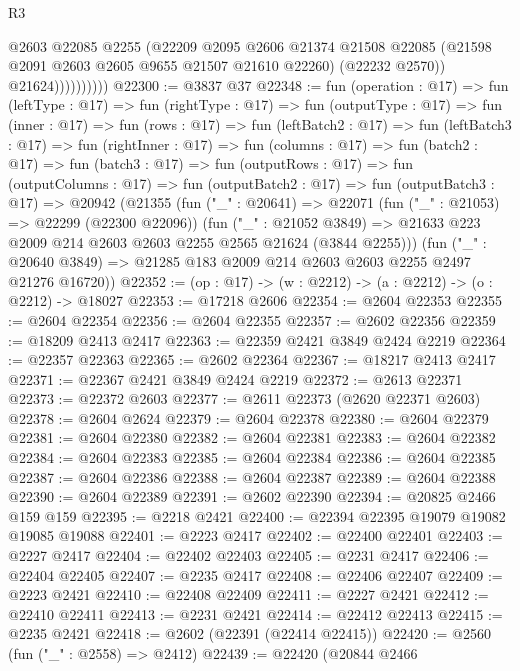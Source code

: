 \begin{lexlean}{R3}
\begin{coremodule}
                        @2603
                        @22085
                        @2255
                        (@22209
                          @2095
                          @2606
                          @21374
                          @21508
                          @22085
                          (@21598 @2091 @2603 @2605 @9655 @21507 @21610 @22260)
                          (@22232 @2570))
                        @21624))))))))))
@22300 := @3837 @37
@22348 := fun (operation : @17) =>
  fun (leftType : @17) =>
  fun (rightType : @17) =>
  fun (outputType : @17) =>
  fun (inner : @17) =>
  fun (rows : @17) =>
  fun (leftBatch2 : @17) =>
  fun (leftBatch3 : @17) =>
  fun (rightInner : @17) =>
  fun (columns : @17) =>
  fun (batch2 : @17) =>
  fun (batch3 : @17) =>
  fun (outputRows : @17) =>
  fun (outputColumns : @17) =>
  fun (outputBatch2 : @17) =>
  fun (outputBatch3 : @17) =>
  @20942
    (@21355
      (fun ("_" : @20641) =>
      @22071
        (fun ("_" : @21053) => @22299 (@22300 @22096))
        (fun ("_" : @21052 @3849) =>
        @21633 @223 @2009 @214 @2603 @2603 @2255 @2565 @21624 (@3844 @2255)))
      (fun ("_" : @20640 @3849) => @21285 @183 @2009 @214 @2603 @2603 @2255 @2497 @21276 @16720))
@22352 := (op : @17) -> (w : @2212) -> (a : @2212) -> (o : @2212) -> @18027
@22353 := @17218 @2606
@22354 := @2604 @22353
@22355 := @2604 @22354
@22356 := @2604 @22355
@22357 := @2602 @22356
@22359 := @18209 @2413 @2417
@22363 := @22359 @2421 @3849 @2424 @2219
@22364 := @22357 @22363
@22365 := @2602 @22364
@22367 := @18217 @2413 @2417
@22371 := @22367 @2421 @3849 @2424 @2219
@22372 := @2613 @22371
@22373 := @22372 @2603
@22377 := @2611 @22373 (@2620 @22371 @2603)
@22378 := @2604 @2624
@22379 := @2604 @22378
@22380 := @2604 @22379
@22381 := @2604 @22380
@22382 := @2604 @22381
@22383 := @2604 @22382
@22384 := @2604 @22383
@22385 := @2604 @22384
@22386 := @2604 @22385
@22387 := @2604 @22386
@22388 := @2604 @22387
@22389 := @2604 @22388
@22390 := @2604 @22389
@22391 := @2602 @22390
@22394 := @20825 @2466 @159 @159
@22395 := @2218 @2421
@22400 := @22394 @22395 @19079 @19082 @19085 @19088
@22401 := @2223 @2417
@22402 := @22400 @22401
@22403 := @2227 @2417
@22404 := @22402 @22403
@22405 := @2231 @2417
@22406 := @22404 @22405
@22407 := @2235 @2417
@22408 := @22406 @22407
@22409 := @2223 @2421
@22410 := @22408 @22409
@22411 := @2227 @2421
@22412 := @22410 @22411
@22413 := @2231 @2421
@22414 := @22412 @22413
@22415 := @2235 @2421
@22418 := @2602 (@22391 (@22414 @22415))
@22420 := @2560 (fun ("_" : @2558) => @2412)
@22439 := @22420
    (@20844
      @2466

\end{coremodule}
\end{lexlean}

